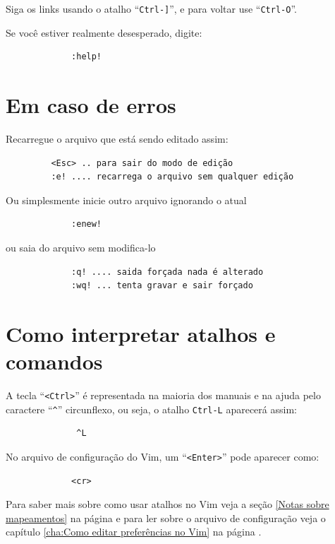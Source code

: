 \documentclass[10pt,a4paper,openany]{book}
\begin{document}
Siga os links usando o atalho ``\verb|Ctrl-]|'', e para voltar use
  ``\verb|Ctrl-O|''.

Se você estiver realmente desesperado, digite:

\begin{verbatim}
			 :help!
\end{verbatim}



\section{Em caso de erros }\label{Em caso de erros }
Recarregue o arquivo que está sendo editado assim:

\begin{verbatim}
		 <Esc> .. para sair do modo de edição
		 :e! .... recarrega o arquivo sem qualquer edição
\end{verbatim}

Ou simplesmente inicie outro arquivo ignorando o atual

\begin{verbatim}
			 :enew!
\end{verbatim}

ou saia do arquivo sem modifica-lo

\begin{verbatim}
			 :q! .... saida forçada nada é alterado
			 :wq! ... tenta gravar e sair forçado
\end{verbatim}

\section{Como interpretar atalhos e comandos}\label{Como interpretar atalhos e comandos}

A tecla ``\verb|<Ctrl>|'' é representada na maioria dos manuais e na ajuda
pelo caractere ``\verb|^|'' circunflexo, ou seja, o atalho \verb|Ctrl-L| aparecerá assim:

\begin{verbatim}
			  ^L
\end{verbatim}

No arquivo de configuração do Vim, um ``\verb|<Enter>|'' pode aparecer como:

\begin{verbatim}
			 <cr>
\end{verbatim}

Para saber mais sobre como usar atalhos no Vim veja a seção \ref{Notas sobre
mapeamentos} na página \pageref{Notas sobre mapeamentos} e para ler sobre o
arquivo de configuração veja o capítulo \ref{cha:Como editar preferências no Vim} na página
\pageref{cha:Como editar preferências no Vim}.
\end{document}
